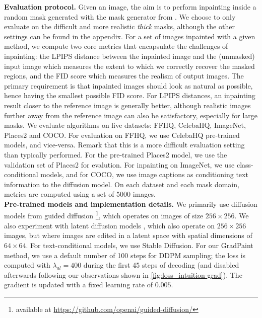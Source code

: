 \noindent \textbf{Evaluation protocol.} Given an image, the aim is to perform inpainting inside a random mask generated with the mask generator from \cite{lama}. We choose to only evaluate on the difficult and more realistic \textit{thick} masks, although the other settings can be found in the appendix. For a set of images inpainted with a given method, we compute two core metrics that encapsulate the challenges of inpainting: the LPIPS distance \cite{zhanglpips2018} between the inpainted image and the (unmasked) input image which measures the extent to which we correctly recover the masked regions, and the FID score \cite{heusel2017gans} which measures the realism of output images. The primary requirement is that inpainted images should look as natural as possible, hence having the smallest possible FID score. For LPIPS distances, an inpainting result closer to the reference image is generally better, although realistic images further away from the reference image can also be satisfactory, especially for large masks. We evaluate algorithms on five datasets: FFHQ, CelebaHQ, ImageNet, Places2 and COCO. For evaluation on FFHQ, we use CelebaHQ pre-trained models, and vice-versa. Remark that this is a more difficult evaluation setting than typically performed. For the pre-trained Places2 model, we use the validation set of Places2 for evalution. For inpainting on ImageNet, we use class-conditional models, and for COCO, we use image captions as conditioning text information to the diffusion model. On each dataset and each mask domain, metrics are computed using a set of 5000 images.\\
 \textbf{Pre-trained models and implementation details.} We primarily use diffusion models from guided diffusion \cite{guided-diffusion} \footnote{available at \url{https://github.com/openai/guided-diffusion/}}, which operates on images of size $256\times256$. We also experiment with latent diffusion models \cite{latentdiffusion}, which also operate on $256\times256$ images, but where images are edited in a latent space with spatial dimensions of $64\times64$.
For text-conditional models, we use Stable Diffusion. For our GradPaint method, we use a default number of 100 steps for DDPM sampling; the loss is computed with $\lambda_{al} =400$ during the first 45 steps of decoding (and disabled afterwards following our observations shown in \ref{fig:loss_intuition-grad}). The gradient is updated with a fixed learning rate of $0.005$.

